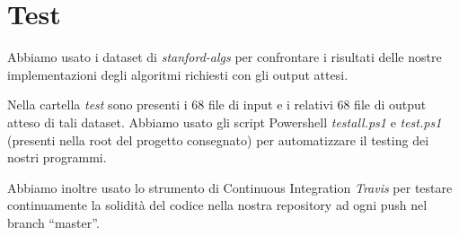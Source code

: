 \section{Test}
\label{cap:tests}

Abbiamo usato i dataset di \textit{stanford-algs} per confrontare i risultati delle nostre implementazioni degli algoritmi richiesti con gli output attesi.

\noindent Nella cartella \textit{test} sono presenti i 68 file di input e i relativi 68 file di output atteso di tali dataset. Abbiamo usato gli script Powershell \textit{testall.ps1} e \textit{test.ps1} (presenti nella root del progetto consegnato) per automatizzare il testing dei nostri programmi.

\noindent Abbiamo inoltre usato lo strumento di Continuous Integration \textit{Travis} per testare continuamente la solidità del codice nella nostra repository ad ogni push nel branch ``master''.
